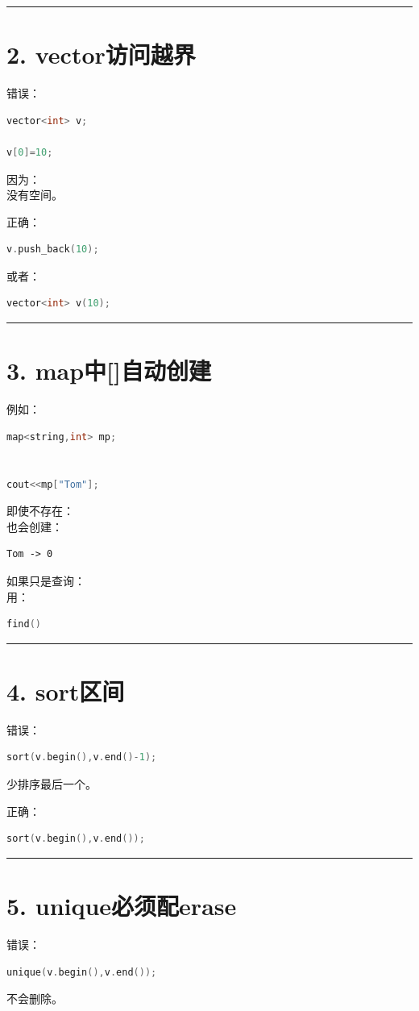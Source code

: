 \documentclass[9pt,twocolumn]{extarticle}
\begin{document}
\noindent\rule{\linewidth}{0.4pt}

\section{2. vector访问越界}
错误：
\begin{lstlisting}[language=C++]
vector<int> v;

v[0]=10;
\end{lstlisting}
因为：\\
没有空间。

正确：
\begin{lstlisting}[language=C++]
v.push_back(10);
\end{lstlisting}
或者：
\begin{lstlisting}[language=C++]
vector<int> v(10);
\end{lstlisting}

\noindent\rule{\linewidth}{0.4pt}

\section{3. map中[]自动创建}
例如：
\begin{lstlisting}[language=C++]
map<string,int> mp;


cout<<mp["Tom"];
\end{lstlisting}
即使不存在：\\
也会创建：
\begin{lstlisting}
Tom -> 0
\end{lstlisting}
如果只是查询：\\
用：
\begin{lstlisting}[language=C++]
find()
\end{lstlisting}

\noindent\rule{\linewidth}{0.4pt}

\section{4. sort区间}
错误：
\begin{lstlisting}[language=C++]
sort(v.begin(),v.end()-1);
\end{lstlisting}
少排序最后一个。

正确：
\begin{lstlisting}[language=C++]
sort(v.begin(),v.end());
\end{lstlisting}

\noindent\rule{\linewidth}{0.4pt}

\section{5. unique必须配erase}
错误：
\begin{lstlisting}[language=C++]
unique(v.begin(),v.end());
\end{lstlisting}
不会删除。
\end{document}
